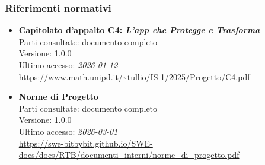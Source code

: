 \documentclass[a4paper,12pt]{article}
\begin{document}
\subsubsection{Riferimenti normativi}\label{sec:riferimenti_normativi}
\begin{itemize}
\item \textbf{Capitolato d'appalto C4: \emph{L'app che Protegge e Trasforma}}\\
Parti consultate: documento completo\\
Versione: 1.0.0\\
Ultimo accesso: \textit{2026-01-12}\\
\url{https://www.math.unipd.it/~tullio/IS-1/2025/Progetto/C4.pdf}

\item \textbf{Norme di Progetto}\\
Parti consultate: documento completo\\
Versione: 1.0.0\\
Ultimo accesso: \textit{2026-03-01}\\
\url{https://swe-bitbybit.github.io/SWE-docs/docs/RTB/documenti_interni/norme_di_progetto.pdf}
\end{itemize}
\end{document}
